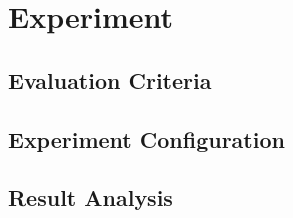 \chapter{Experiment}
\section{Evaluation Criteria}
\section{Experiment Configuration}
\section{Result Analysis}